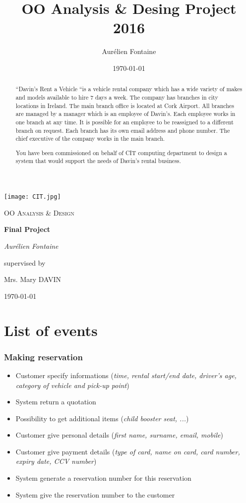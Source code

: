 \documentclass{report}
\author{Aurélien Fontaine}
\title{OO Analysis \& Desing Project 2016}
\date{\today}
\begin{document}
\begin{titlepage}
    \centering
    \texttt{[image: CIT.jpg]}\par\vspace{1cm}
    {\scshape\Large OO Analysis \& Design\par}
    \vspace{1.5cm}
    {\huge\bfseries Final Project\par}
    \vspace{2cm}
    {\Large\itshape Aurélien Fontaine\par}
    \vfill
    supervised by\par
    Mrs. Mary \textsc{DAVIN}
    \vfill
    {\large \today\par}
\end{titlepage}
\begin{abstract}
    “Davin’s Rent a Vehicle “is a vehicle rental company which has a wide variety of makes and models available to hire 7 days a week. The company has branches in city locations in Ireland. The main branch office is located at Cork Airport. All branches are managed by a manager which is an employee of Davin’s. Each employee works in one branch at any time. It is possible for an employee to be reassigned to a different branch on request. Each branch has its own email address and phone number. The chief executive of the company works in the main branch.

    You have been commissioned on behalf of CIT computing department to design a system that would support the needs of Davin’s rental business.
\end{abstract}
\tableofcontents
\part{List of events}
\setcounter{chapter}{1}
\section{Making reservation}
    \begin{itemize}
        \item Customer specify informations (\textit{time, rental start/end date, driver's age, category of vehicle and pick-up point})
        \item System return a quotation
        \item Possibility to get additional items (\textit{child booster seat, ...})
        \item Customer give personal details (\textit{first name, surname, email, mobile})
        \item Customer give payment details (\textit{type of card, name on card, card number, expiry date, CCV number})
        \item System generate a reservation number for this reservation
        \item System give the reservation number to the customer
    \end{itemize}
\end{document}

